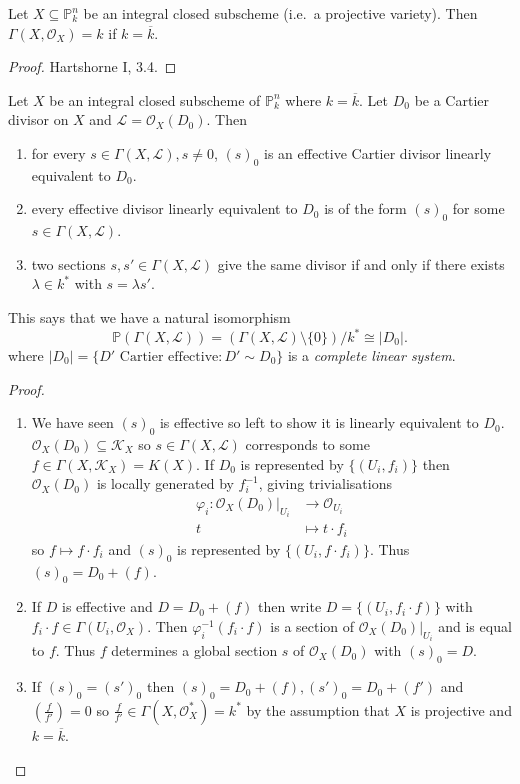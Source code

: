 \documentclass[a4paper]{article}
\renewcommand*{\P}{\mathbb{P}}
\newcommand{\sh}[1]{\mathcal{#1}} %
\begin{document}
\begin{theorem}
  Let \(X \subseteq \P^n_k\) be an integral closed subscheme (i.e.\ a projective variety). Then \(\Gamma(X, \sh O_X) = k\) if \(k = \overline k\).
\end{theorem}

\begin{proof}
  Hartshorne I, 3.4.
\end{proof}

\begin{theorem}
  Let \(X\) be an integral closed subscheme of \(\P^n_k\) where \(k = \overline k\). Let \(D_0\) be a Cartier divisor on \(X\) and \(\sh L = \sh O_X(D_0)\). Then
  \begin{enumerate}
  \item for every \(s \in \Gamma(X, \sh L), s \neq 0\), \((s)_0\) is an effective Cartier divisor linearly equivalent to \(D_0\).
  \item every effective divisor linearly equivalent to \(D_0\) is of the form \((s)_0\) for some \(s \in \Gamma(X, \sh L)\).
  \item two sections \(s, s' \in \Gamma(X, \sh L)\) give the same divisor if and only if there exists \(\lambda \in k^*\) with \(s = \lambda s'\).
  \end{enumerate}
\end{theorem}

This says that we have a natural isomorphism
\[
  \P(\Gamma(X, \sh L)) = (\Gamma(X, \sh L) \setminus \{0\})/k^* \cong |D_0|.
\]
where \(|D_0| = \{D' \text{ Cartier effective}: D' \sim D_0\}\) is a \emph{complete linear system}.

\begin{proof}\leavevmode
  \begin{enumerate}
  \item We have seen \((s)_0\) is effective so left to show it is linearly equivalent to \(D_0\). \(\sh O_X(D_0) \subseteq \sh K_X\) so \(s \in \Gamma(X, \sh L)\) corresponds to some \(f \in \Gamma(X, \sh K_X) = K(X)\). If \(D_0\) is represented by \(\{(U_i, f_i)\}\) then \(\sh O_X(D_0)\) is locally generated by \(f_i^{-1}\), giving trivialisations
    \begin{align*}
      \varphi_i: \sh O_X(D_0)|_{U_i} &\to \sh O_{U_i} \\
      t &\mapsto t \cdot f_i
    \end{align*}
    so \(f \mapsto f \cdot f_i\) and \((s)_0\) is represented by \(\{(U_i, f \cdot f_i)\}\). Thus \((s)_0 = D_0 + (f)\).
  \item If \(D\) is effective and \(D = D_0 + (f)\) then write \(D = \{(U_i, f_i \cdot f)\}\) with \(f_i \cdot f \in \Gamma(U_i, \sh O_X)\). Then \(\varphi_i^{-1}(f_i \cdot f)\) is a section of \(\sh O_X(D_0)|_{U_i}\) and is equal to \(f\). Thus \(f\) determines a global section \(s\) of \(\sh O_X(D_0)\) with \((s)_0 = D\).
  \item If \((s)_0 = (s')_0\) then \((s)_0 = D_0 + (f), (s')_0 = D_0 + (f')\) and \((\frac{f}{f'}) = 0\) so \(\frac{f}{f'} \in \Gamma(X, \sh O_X^*) = k^*\) by the assumption that \(X\) is projective and \(k = \overline k\).
  \end{enumerate}
\end{proof}
\end{document}
